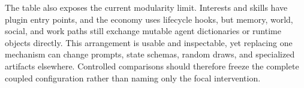 The table also exposes the current modularity limit.  Interests and skills have
plugin entry points, and the economy uses lifecycle hooks, but memory, world,
social, and work paths still exchange mutable agent dictionaries or runtime
objects directly.  This arrangement is usable and inspectable, yet replacing
one mechanism can change prompts, state schemas, random draws, and specialized
artifacts elsewhere.  Controlled comparisons should therefore freeze the
complete coupled configuration rather than naming only the focal intervention.
